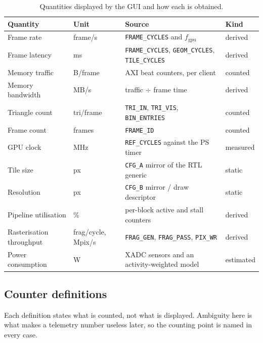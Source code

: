 \documentclass[11pt,a4paper]{article}
\begin{document}
\begin{table}[ht]
\centering
\small
\begin{tabularx}{\textwidth}{@{}llXl@{}}
\toprule
\textbf{Quantity} & \textbf{Unit} & \textbf{Source} & \textbf{Kind} \\
\midrule
Frame rate              & frame/s      & \texttt{FRAME\_CYCLES} and $f_{\mathrm{gpu}}$ & derived \\
Frame latency           & ms           & \texttt{FRAME\_CYCLES}, \texttt{GEOM\_CYCLES}, \texttt{TILE\_CYCLES} & derived \\
Memory traffic          & B/frame      & AXI beat counters, per client & counted \\
Memory bandwidth        & MB/s         & traffic $\div$ frame time & derived \\
Triangle count          & tri/frame    & \texttt{TRI\_IN}, \texttt{TRI\_VIS}, \texttt{BIN\_ENTRIES} & counted \\
Frame count             & frames       & \texttt{FRAME\_ID} & counted \\
GPU clock               & MHz          & \texttt{REF\_CYCLES} against the PS timer & measured \\
Tile size               & px           & \texttt{CFG\_A} mirror of the RTL generic & static \\
Resolution              & px           & \texttt{CFG\_B} mirror / draw descriptor & static \\
Pipeline utilisation    & \%           & per-block active and stall counters & derived \\
Rasterisation throughput& frag/cycle, Mpix/s & \texttt{FRAG\_GEN}, \texttt{FRAG\_PASS}, \texttt{PIX\_WR} & derived \\
Power consumption       & W            & XADC sensors and an activity-weighted model & estimated \\
\bottomrule
\end{tabularx}
\caption{Quantities displayed by the GUI and how each is obtained.}
\label{tab:gui-metrics}
\end{table}

\subsection{Counter definitions}
\label{sec:gui-counters}

Each definition states what is counted, not what is displayed. Ambiguity here is
what makes a telemetry number useless later, so the counting point is named in
every case.
\end{document}
